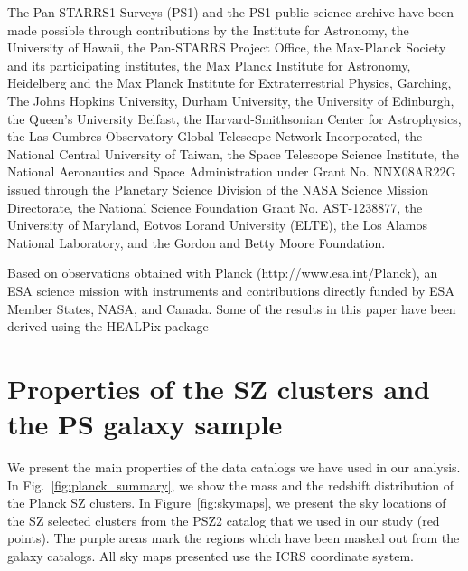 \documentclass[iop, apjl, twocolappendix, numberedappendix]{emulateapj}
\begin{document}
The Pan-STARRS1 Surveys (PS1) and the PS1 public science archive
have been made possible through contributions by the Institute for
Astronomy, the University of Hawaii, the Pan-STARRS Project Office,
the Max-Planck Society and its participating institutes, the Max
Planck Institute for Astronomy, Heidelberg and the Max Planck
Institute for Extraterrestrial Physics, Garching, The Johns Hopkins
University, Durham University, the University of Edinburgh, the
Queen's University Belfast, the Harvard-Smithsonian Center for
Astrophysics, the Las Cumbres Observatory Global Telescope Network
Incorporated, the National Central University of Taiwan, the Space
Telescope Science Institute, the National Aeronautics and Space
Administration under Grant No. NNX08AR22G issued through the
Planetary Science Division of the NASA Science Mission Directorate,
the National Science Foundation Grant No. AST-1238877, the
University of Maryland, Eotvos Lorand University (ELTE), the Los
Alamos National Laboratory, and the Gordon and Betty Moore
Foundation.

Based on observations obtained with Planck
(http://www.esa.int/Planck), an ESA science mission with instruments
and contributions directly funded by ESA Member States, NASA, and
Canada.  Some of the results in this paper have been derived using
the HEALPix package \citep{gorski2005}




\appendix


\section{Properties of the SZ clusters and the PS galaxy sample}
\label{sec:figures}

We present the main properties of the data catalogs we have used in our
analysis. In Fig.~\ref{fig:planck_summary}, we show the mass and the redshift
distribution of the Planck SZ clusters. In Figure~\ref{fig:skymaps}, we present
the sky locations of the SZ selected clusters from the PSZ2 catalog that we
used in our study (red points). The purple areas mark the regions which have
been masked out from the galaxy catalogs. All sky maps presented use the ICRS
coordinate system.
\end{document}
